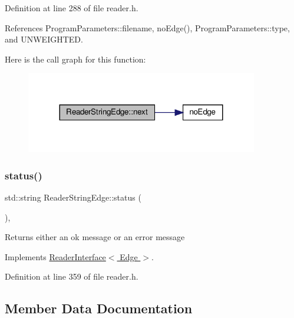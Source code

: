 Definition at line 288 of file reader.\+h.



References Program\+Parameters\+::filename, no\+Edge(), Program\+Parameters\+::type, and U\+N\+W\+E\+I\+G\+H\+T\+ED.

Here is the call graph for this function\+:\nopagebreak
\begin{figure}[H]
\begin{center}
\leavevmode
\includegraphics[width=287pt]{classReaderStringEdge_a8de930135fa1fbb3a9610da2259e93ce_cgraph}
\end{center}
\end{figure}
\mbox{\label{classReaderStringEdge_a11fe073e85d07a48d0f0549b51af36b6}} 
\subsubsection{\texorpdfstring{status()}{status()}}
{\footnotesize\ttfamily std\+::string Reader\+String\+Edge\+::status (\begin{DoxyParamCaption}{ }\end{DoxyParamCaption})\hspace{0.3cm}{\ttfamily [inline]}, {\ttfamily [virtual]}}

\begin{DoxyReturn}{Returns}
either an ok message or an error message 
\end{DoxyReturn}


Implements \hyperlink{classReaderInterface_a5f86ed49eac808ed0a912f7d670c4042}{Reader\+Interface$<$ Edge $>$}.



Definition at line 359 of file reader.\+h.



\subsection{Member Data Documentation}
\mbox{\label{classReaderStringEdge_ac0b972f8b6c07ec0e70cc6c9a8531216}} 
